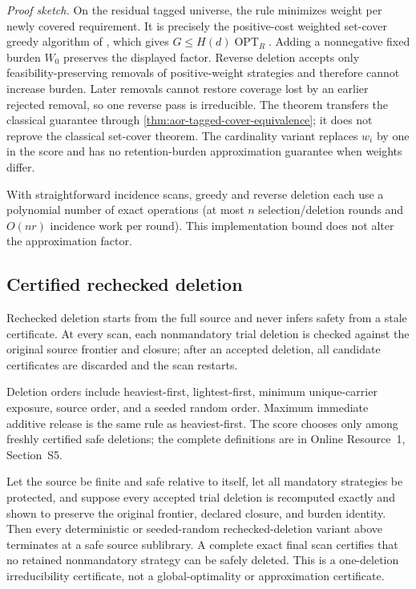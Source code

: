 \noindent\emph{Proof sketch.}
On the residual tagged universe, the rule minimizes weight per newly covered requirement. It is precisely the positive-cost
weighted set-cover greedy algorithm of \citet{Chvatal1979}, which gives
\(G\leq H(d)\operatorname{OPT}_R\).  Adding a nonnegative fixed burden
\(W_0\) preserves the displayed factor.  Reverse deletion accepts only
feasibility-preserving removals of positive-weight strategies and therefore
cannot increase burden.  Later removals cannot restore coverage lost by an
earlier rejected removal, so one reverse pass is irreducible.  The theorem
transfers the classical guarantee through
\cref{thm:aor-tagged-cover-equivalence}; it does not reprove the classical
set-cover theorem.  The cardinality variant replaces \(w_i\) by one in the
score and has no retention-burden approximation guarantee when weights differ.

With straightforward incidence scans, greedy and reverse deletion each use a
polynomial number of exact operations (at most \(n\) selection/deletion rounds
and \(O(nr)\) incidence work per round).  This implementation bound does not
alter the approximation factor.

\subsection{Certified rechecked deletion}
\label{subsec:aor-certified-deletion-suite}

Rechecked deletion starts from the full source and never infers safety from a
stale certificate.  At every scan, each nonmandatory trial deletion is checked
against the original source frontier and closure; after an accepted deletion,
all candidate certificates are discarded and the scan restarts.

Deletion orders include heaviest-first, lightest-first, minimum unique-carrier
exposure, source order, and a seeded random order. Maximum immediate additive
release is the same rule as heaviest-first. The score chooses only among freshly
certified safe deletions; the complete definitions are in Online Resource~1,
Section~S5.

\begin{proposition}
\label{prop:aor-certified-deletion-endpoint}
Let the source be finite and safe relative to itself, let all mandatory
strategies be protected, and suppose every accepted trial deletion is
recomputed exactly and shown to preserve the original frontier, declared
closure, and burden identity.  Then every deterministic or seeded-random
rechecked-deletion variant above terminates at a safe source sublibrary.  A
complete exact final scan certifies that no retained nonmandatory strategy can
be safely deleted.  This is a one-deletion irreducibility certificate, not a
global-optimality or approximation certificate.
\end{proposition}

